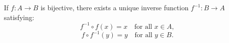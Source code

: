 If $f: A \to B$ is bijective, there exists a unique inverse function $f^{-1}: B \to A$ satisfying:
$$f^{-1} \circ f(x) = x \quad \text{for all } x \in A,$$
$$f \circ f^{-1}(y) = y \quad \text{for all } y \in B.$$
